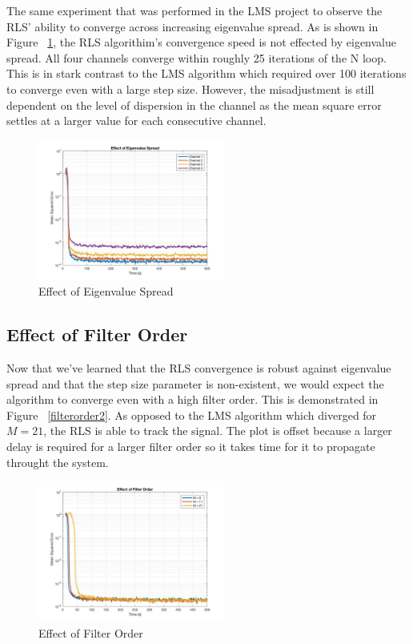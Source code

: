 \documentclass[journal]{IEEEtran}
\begin{document}
The same experiment that was performed in the LMS project to observe the RLS' ability to
converge across increasing eigenvalue spread. As is shown in Figure ~\ref{fig:eigenspread2},
the RLS algorithim's convergence speed is not effected by eigenvalue spread. All four channels converge
within roughly 25 iterations of the N loop. This is in stark contrast to the LMS algorithm which
required over 100 iterations to converge even with a large step size. However, the misadjustment is still dependent on
the level of dispersion in the channel as the mean square error settles at a larger value for each consecutive channel.
\begin{figure}[H]
  \centering
  \captionsetup{justification=centering}
  \includegraphics[width=0.55\textwidth, inner] {Plots/Project2_eigenspread.jpg}
  \caption{Effect of Eigenvalue Spread}
    \label{fig:eigenspread2}
\end{figure}
\subsection{Effect of Filter Order}
Now that we've learned that the RLS convergence is robust against eigenvalue spread
and that the step size parameter is non-existent, we would expect the algorithm to
converge even with a high filter order. This is demonstrated in Figure ~\ref{filterorder2}. As opposed to the
LMS algorithm which diverged for $ M = 21$, the RLS is able to track the signal. The plot is offset because
a larger delay is required for a larger filter order so it takes time for it to propagate throught the system.
\begin{figure}[H]
  \centering
  \captionsetup{justification=centering}
  \includegraphics[width=0.55\textwidth, inner] {Plots/Project2_filterorder.jpg}
  \caption{Effect of Filter Order}
    \label{fig:filterorder2}
\end{figure}
\end{document}

